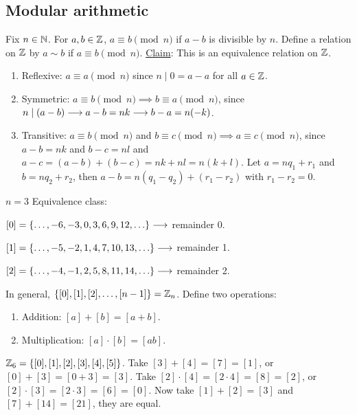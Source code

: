 \documentclass[]{article}
\begin{document}
\subsection*{Modular arithmetic}
Fix $n\in\mathbb{N}$. For $a,b\in\mathbb{Z}$, $a \equiv b\pmod{n}$ if $a-b$ is divisible by $n$.
Define a relation on $\mathbb{Z}$ by $a\sim b$ if $a\equiv b\pmod{n}$.
\ul{Claim}: This is an equivalence relation on $\mathbb{Z}$.
\begin{enumerate}
	\item Reflexive: $a\equiv a \pmod{n}$ since $n\mid 0 = a-a$ for all $a\in\mathbb{Z}$.
	\item Symmetric: $a\equiv b\pmod{n}\implies b\equiv a\pmod{n}$, since $n\mid(a-b) \longrightarrow a-b=nk \longrightarrow b-a = n(-k)$.
	\item Transitive: $a\equiv b\pmod{n}$ and $b\equiv c\pmod{n} \implies a\equiv c\pmod{n}$, since $a-b=nk$ and $b-c=nl$ and $a-c = (a-b)+(b-c) = nk+nl = n(k+l)$.
	Let $a = nq_1+r_1$ and $b=nq_2+r_2$, then $a-b = n(q_1-q_2) + (r_1-r_2)$ with $r_1-r_2 = 0$.
\end{enumerate}

\begin{example}
	\ul{$n=3$} Equivalence class:

	$[0] = \set{ \dots,-6,-3,0,3,6,9,12,\dots } \lra $ remainder 0.

	$[1] = \set{ \dots,-5,-2,1,4,7,10,13,\dots } \lra $ remainder 1.

	$[2] = \set{ \dots, -4,-1,2,5,8,11,14,\dots } \lra $ remainder 2.
\end{example}
In general, $\{[0],[1],[2],\dots,[n-1]\} = \mathbb{Z}_n$.
Define two operations:
\begin{enumerate}
	\item Addition: $[a]+[b] = [a+b]$.
	\item Multiplication: $[a]\cdot[b] = [ab]$.
	
\end{enumerate}
\begin{example}
	$\mathbb{Z}_6 = \{[0],[1],[2],[3],[4],[5]\}$. Take $[3]+[4] = [7]=[1]$, or $[0]+[3] = [0+3] = [3]$. Take $[2]\cdot[4] = [2\cdot 4] = [8] = [2]$, or $[2]\cdot[3] = [2\cdot 3] = [6] = [0]$. Now take $[1]+[2] = [3]$ and $[7]+[14]=[21]$, they are equal.
\end{example}

\newpage
\end{document}
